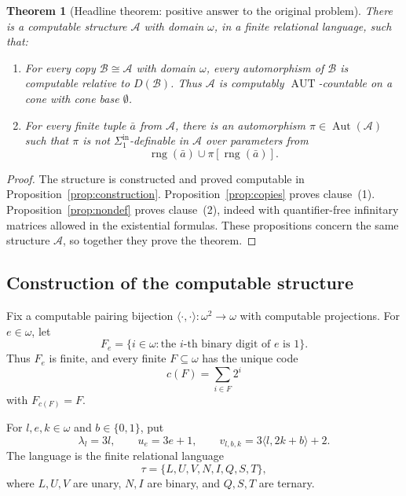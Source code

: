 \documentclass[12pt]{article}
\newtheorem{theorem}{Theorem}[section]
\theoremstyle{definition}
\theoremstyle{remark}
\newcommand{\Aut}{\operatorname{Aut}}
\newcommand{\rng}{\operatorname{rng}}
\begin{document}
\begin{theorem}[Headline theorem: positive answer to the original problem]\label{thm:main}
There is a computable structure \(\mathcal A\) with domain \(\omega\), in a finite relational language, such that:
\begin{enumerate}
\item For every copy \(\mathcal B\cong\mathcal A\) with domain \(\omega\), every automorphism of \(\mathcal B\) is computable relative to \(D(\mathcal B)\).  Thus \(\mathcal A\) is computably \(\operatorname{AUT}\)-countable on a cone with cone base \(\emptyset\).
\item For every finite tuple \(\bar a\) from \(\mathcal A\), there is an automorphism \(\pi\in\Aut(\mathcal A)\) such that \(\pi\) is not \(\Sigma^{\mathrm{in}}_1\)-definable in \(\mathcal A\) over parameters from
\[
\rng(\bar a)\cup \pi[\rng(\bar a)].
\]
\end{enumerate}
\end{theorem}

\begin{proof}
The structure is constructed and proved computable in Proposition~\ref{prop:construction}.  Proposition~\ref{prop:copies} proves clause~(1).  Proposition~\ref{prop:nondef} proves clause~(2), indeed with quantifier-free infinitary matrices allowed in the existential formulas.  These propositions concern the same structure \(\mathcal A\), so together they prove the theorem.
\end{proof}

\subsection{Construction of the computable structure}\label{sec:construction}

Fix a computable pairing bijection \(\langle\cdot,\cdot\rangle:\omega^2\to\omega\) with computable projections.  For \(e\in\omega\), let
\[
F_e=\{i\in\omega:\text{the \(i\)-th binary digit of \(e\) is \(1\)}\}.
\]
Thus \(F_e\) is finite, and every finite \(F\subseteq\omega\) has the unique code
\[
c(F)=\sum_{i\in F}2^i
\]
with \(F_{c(F)}=F\).

For \(l,e,k\in\omega\) and \(b\in\{0,1\}\), put
\[
\lambda_l=3l,\qquad u_e=3e+1,\qquad v_{l,b,k}=3\langle l,2k+b\rangle+2.
\]
The language is the finite relational language
\[
\tau=\{L,U,V,N,I,Q,S,T\},
\]
where \(L,U,V\) are unary, \(N,I\) are binary, and \(Q,S,T\) are ternary.
\end{document}
